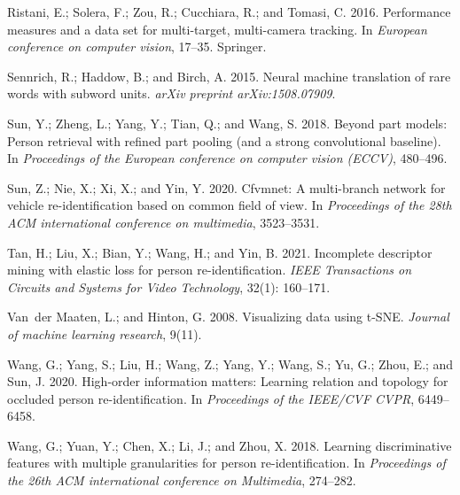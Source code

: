 \documentclass[letterpaper]{article} \usepackage{aaai23}  \usepackage{times}  \usepackage{helvet}  \usepackage{courier}  \usepackage[hyphens]{url}  \usepackage{graphicx} \urlstyle{rm} \def\UrlFont{\rm}  \usepackage{natbib}  \usepackage{caption} \frenchspacing  \setlength{\pdfpagewidth}{8.5in}  \setlength{\pdfpageheight}{11in}  \usepackage{algorithm}
\begin{document}
\begin{small}
\begin{thebibliography}{65}
Ristani, E.; Solera, F.; Zou, R.; Cucchiara, R.; and Tomasi, C. 2016.
\newblock Performance measures and a data set for multi-target, multi-camera
  tracking.
\newblock In \emph{European conference on computer vision}, 17--35. Springer.

Sennrich, R.; Haddow, B.; and Birch, A. 2015.
\newblock Neural machine translation of rare words with subword units.
\newblock \emph{arXiv preprint arXiv:1508.07909}.

Sun, Y.; Zheng, L.; Yang, Y.; Tian, Q.; and Wang, S. 2018.
\newblock Beyond part models: Person retrieval with refined part pooling (and a
  strong convolutional baseline).
\newblock In \emph{Proceedings of the European conference on computer vision
  (ECCV)}, 480--496.

Sun, Z.; Nie, X.; Xi, X.; and Yin, Y. 2020.
\newblock Cfvmnet: A multi-branch network for vehicle re-identification based
  on common field of view.
\newblock In \emph{Proceedings of the 28th ACM international conference on
  multimedia}, 3523--3531.

Tan, H.; Liu, X.; Bian, Y.; Wang, H.; and Yin, B. 2021.
\newblock Incomplete descriptor mining with elastic loss for person
  re-identification.
\newblock \emph{IEEE Transactions on Circuits and Systems for Video
  Technology}, 32(1): 160--171.

Van~der Maaten, L.; and Hinton, G. 2008.
\newblock Visualizing data using t-SNE.
\newblock \emph{Journal of machine learning research}, 9(11).

Wang, G.; Yang, S.; Liu, H.; Wang, Z.; Yang, Y.; Wang, S.; Yu, G.; Zhou, E.;
  and Sun, J. 2020.
\newblock High-order information matters: Learning relation and topology for
  occluded person re-identification.
\newblock In \emph{Proceedings of the IEEE/CVF CVPR}, 6449--6458.

Wang, G.; Yuan, Y.; Chen, X.; Li, J.; and Zhou, X. 2018.
\newblock Learning discriminative features with multiple granularities for
  person re-identification.
\newblock In \emph{Proceedings of the 26th ACM international conference on
  Multimedia}, 274--282.


\end{thebibliography}
\end{small}
\end{document}
